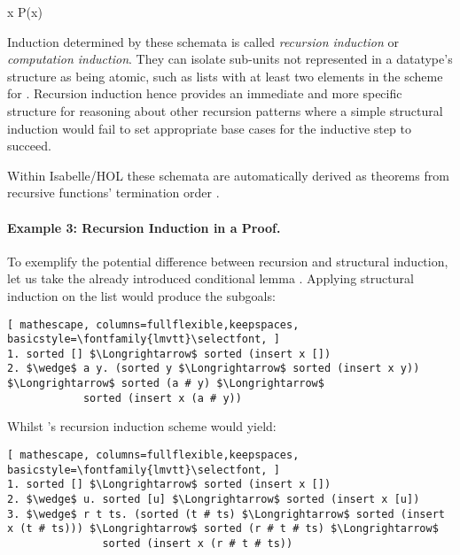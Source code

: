   {\forall x \;\; P\;(x)}

\vspace{2 mm}

Induction determined by these schemata is called \emph{recursion induction} or \emph{computation induction}.
%
They can isolate sub-units not represented in a datatype's structure as being atomic, such as lists with at least two elements in the scheme for .
%
Recursion induction hence provides an immediate and more specific structure for reasoning about other recursion patterns where a simple structural induction would fail to set appropriate base cases for the inductive step to succeed.

Within Isabelle/HOL these schemata are automatically derived as theorems from recursive functions' termination order \cite{krauss-term}. 

\paragraph*{Example 3: Recursion Induction in a Proof.}


To exemplify the potential difference between recursion and structural induction, let us take the already introduced conditional lemma .
%
Applying structural induction on the list  would produce the subgoals:

\begin{lstlisting}[ mathescape, columns=fullflexible,keepspaces, basicstyle=\fontfamily{lmvtt}\selectfont, ]
1. sorted [] $\Longrightarrow$ sorted (insert x [])
2. $\wedge$ a y. (sorted y $\Longrightarrow$ sorted (insert x y)) $\Longrightarrow$ sorted (a # y) $\Longrightarrow$
            sorted (insert x (a # y))
\end{lstlisting}

\noindent Whilst 's recursion induction scheme would yield:

\begin{lstlisting}[ mathescape, columns=fullflexible,keepspaces, basicstyle=\fontfamily{lmvtt}\selectfont, ]
1. sorted [] $\Longrightarrow$ sorted (insert x [])
2. $\wedge$ u. sorted [u] $\Longrightarrow$ sorted (insert x [u])
3. $\wedge$ r t ts. (sorted (t # ts) $\Longrightarrow$ sorted (insert x (t # ts))) $\Longrightarrow$ sorted (r # t # ts) $\Longrightarrow$
               sorted (insert x (r # t # ts))
\end{lstlisting}

